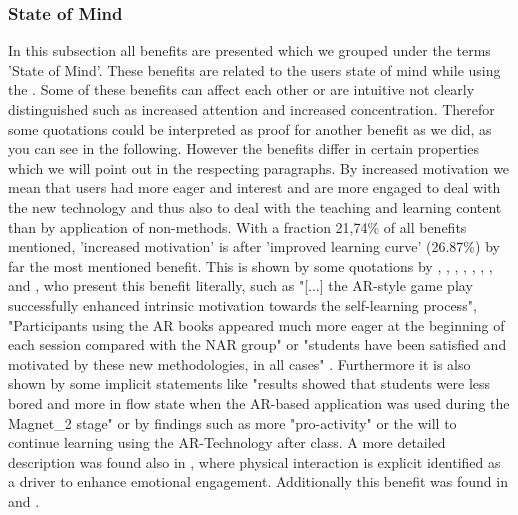 \subsubsection{State of Mind}
In this subsection all benefits are presented which we grouped under the terms 'State of Mind'. These benefits are related to the users state of mind while using the \AR \appns. Some of these benefits can affect 
each other or are intuitive not clearly distinguished such as increased attention and increased concentration. Therefor some quotations could be interpreted as proof for another benefit as we did, as you can see in the following.
However the benefits differ in certain properties which we will point out in the respecting paragraphs.
By increased motivation we mean that users had more eager and interest and are more engaged to deal with the new technology and thus also to deal with the teaching and learning content than by application of non-\AR methods. With a fraction 21,74\% of all benefits mentioned, 
'increased motivation' is after 'improved learning curve' (26.87\%) by far the most mentioned benefit. This is shown by some quotations by \cite{Dunser.2012}, \cite{Iwata.2011}, 
\cite{Kamarainen.2013}, \cite{Liu.2009b}, \cite{MartinGutierrez.2011}, \cite{MartinGutierrez.2011}, \cite{Redondo.2013}, \cite{VateULan.2012} and \cite{Yen.2013}, who present this benefit literally, such as "[...] the AR-style game play successfully enhanced intrinsic motivation towards the self-learning process"\autocite[113]{Iwata.2011}, "Participants 
using the AR books appeared much more eager at the beginning of each session compared with the NAR group"\autocite[112]{Dunser.2012} or "students have been satisfied and motivated by these new methodologies, in all cases"
\autocite[60]{Redondo.2013}. Furthermore it is also shown by some implicit statements like "results showed that students were less bored and more in flow state
when the AR-based application was used during the Magnet\_2 stage"\autocite[8]{Ibanez.2014} or by findings such as more "pro-activity"\autocite[10]{Chang.2014}\mulcit\autocite[187]{Zhang.2014} or the will to continue learning using
the AR-Technology after class\autocite[8]{Liu.2009b}. A more detailed description was found also in \cite{Iwata.2011}, where physical interaction is explicit identified as a driver to enhance emotional
engagement.\autocite[cf.][8]{Iwata.2011} Additionally this benefit was found in \cite{Li.2011} and \cite{Hou.2013}.\autocite[cf.][322]{Li.2011}\mulcit\autocite[cf.][448]{Hou.2013}
